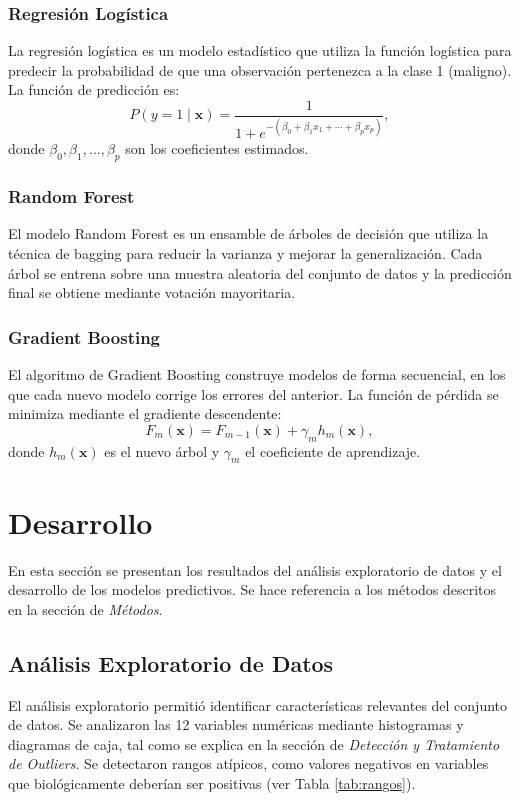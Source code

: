 \subsubsection{Regresión Logística}
La regresión logística es un modelo estadístico que utiliza la función logística para predecir la probabilidad de que una observación pertenezca a la clase 1 (maligno). La función de predicción es:
\[
P(y=1 \mid \mathbf{x}) = \frac{1}{1 + e^{-(\beta_0 + \beta_1 x_1 + \cdots + \beta_p x_p)}},
\]
donde $\beta_0, \beta_1, \ldots, \beta_p$ son los coeficientes estimados.

\subsubsection{Random Forest}
El modelo Random Forest es un ensamble de árboles de decisión que utiliza la técnica de bagging para reducir la varianza y mejorar la generalización. Cada árbol se entrena sobre una muestra aleatoria del conjunto de datos y la predicción final se obtiene mediante votación mayoritaria.

\subsubsection{Gradient Boosting}
El algoritmo de Gradient Boosting construye modelos de forma secuencial, en los que cada nuevo modelo corrige los errores del anterior. La función de pérdida se minimiza mediante el gradiente descendente:
\[
F_m(\mathbf{x}) = F_{m-1}(\mathbf{x}) + \gamma_m h_m(\mathbf{x}),
\]
donde $h_m(\mathbf{x})$ es el nuevo árbol y $\gamma_m$ el coeficiente de aprendizaje.

\section{Desarrollo}
En esta sección se presentan los resultados del análisis exploratorio de datos y el desarrollo de los modelos predictivos. Se hace referencia a los métodos descritos en la sección de \textit{Métodos}.

\subsection{Análisis Exploratorio de Datos}
El análisis exploratorio permitió identificar características relevantes del conjunto de datos. Se analizaron las 12 variables numéricas mediante histogramas y diagramas de caja, tal como se explica en la sección de \textit{Detección y Tratamiento de Outliers}. Se detectaron rangos atípicos, como valores negativos en variables que biológicamente deberían ser positivas (ver Tabla \ref{tab:rangos}).

